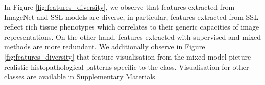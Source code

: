 In Figure \ref{fig:features_diversity}, we observe that features extracted from ImageNet and SSL models are diverse, in particular, features extracted from SSL reflect rich tissue phenotypes which correlates to their generic capacities of image representations. On the other hand, features extracted with supervised and mixed methods are more redundant. 
We additionally observe in Figure \ref{fig:features_diversity} that feature visualisation from the mixed model picture realistic histopathological patterns specific to the class. Visualisation for other classes are available in Supplementary Materials.


